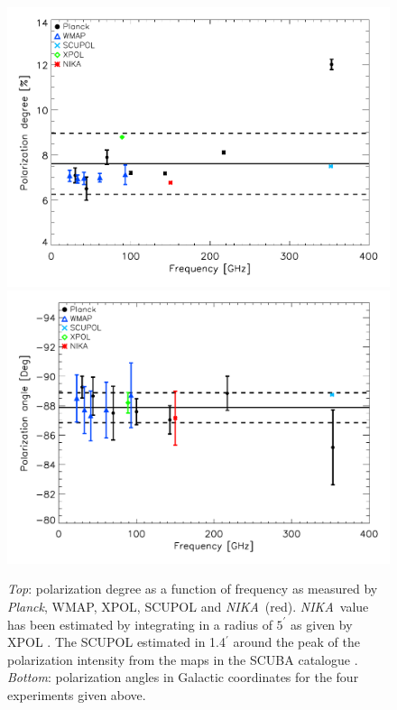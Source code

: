 \documentclass[twocolumn,traditabstract]{aa}
\def\NIKA{\textit{NIKA}}
\def\Planck{\textit{Planck}}
\begin{document}
\begin{figure}
  \centering
          { \includegraphics[width=1\linewidth,keepaspectratio]{figures/pdegree_comparison.pdf}}
          { \includegraphics[width=1\linewidth,keepaspectratio]{figures/angle_comparison.pdf}} 
            \caption{{\it Top}: polarization degree as a function of frequency as measured by \Planck, WMAP, XPOL, SCUPOL and \NIKA\ (red). \NIKA\ value has been estimated by integrating in a radius of $5^{\prime}$ as given by XPOL \citep{aumont2010}. The SCUPOL  estimated in 1.4$^\prime$ around the peak of the polarization intensity from the maps in the SCUBA catalogue \citep{scubapol}.
            {\it Bottom}: polarization angles in Galactic coordinates for the four experiments given above.}
\label{crab_p_angle_comparison}		
  \end{figure}
\end{document}
